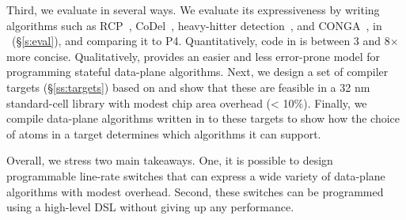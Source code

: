 Third, we evaluate \pktlanguage in several ways. We evaluate its expressiveness
by writing algorithms such as RCP~\cite{rcp}, CoDel~\cite{codel}, heavy-hitter
detection~\cite{opensketch}, and CONGA~\cite{conga}, in
\pktlanguage~(\S\ref{s:eval}), and comparing it to P4.  Quantitatively, code in
\pktlanguage is between 3 and 8$\times$ more concise. Qualitatively,
\pktlanguage provides an easier and less error-prone model for programming
stateful data-plane algorithms.  Next, we design a set of compiler targets
(\S\ref{ss:targets}) based on \absmachine and show that these are feasible in a
32 nm standard-cell library with modest chip area overhead (< 10\%). Finally,
we compile data-plane algorithms written in \pktlanguage to these targets to
show how the choice of atoms in a target determines which algorithms it can
support.

Overall, we stress two main takeaways. One, it is possible to design
programmable line-rate switches that can express a wide variety of data-plane
algorithms with modest overhead. Second, these switches can be programmed using
a high-level DSL without giving up any performance.
